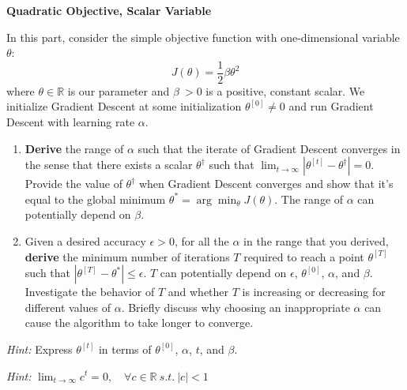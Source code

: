 \item {} {\bf Quadratic Objective, Scalar Variable}

In this part, consider the simple objective function with one-dimensional variable $\theta$:
\begin{equation*}
	J(\theta) = \frac{1}{2}\beta\theta^2
\end{equation*}
where $\theta \in\mathbb{R}$ is our parameter and $\beta\ > 0$ is a positive, constant scalar.
We initialize Gradient Descent at some initialization $\theta^{[0]} \neq 0$ and run Gradient Descent with learning rate $\alpha$. 

\begin{enumerate}
	\item \textbf{Derive} the range of $\alpha$ such that the iterate of Gradient Descent converges in the sense that there exists a scalar $\theta^\dagger$ such that $\lim_{t\to\infty} |\theta^{[t]}-\theta^\dagger| = 0$.   Provide the value of $\theta^\dagger$ when Gradient Descent converges and show that it's equal to the global minimum $\theta^* = \arg\min_\theta J(\theta)$. The range of $\alpha$ can potentially depend on $\beta$. 
	\item Given a desired accuracy $\epsilon > 0$, for all the $\alpha$ in the range that you derived, \textbf{derive} the minimum number of iterations $T$ required to reach a point $\theta^{[T]}$ such that $|\theta^{[T]} - \theta^*| \le \epsilon$. $T$ can potentially depend on $\epsilon$, $\theta^{[0]}$, $\alpha$, and $\beta$. Investigate the behavior of $T$ and whether $T$ is increasing or decreasing for different values of $\alpha$. Briefly discuss why choosing an inappropriate $\alpha$ can cause the algorithm to take longer to converge.
\end{enumerate}

\textit{Hint:} Express $\theta^{[t]}$ in terms of $\theta^{[0]}$, $\alpha$, $t$, and $\beta$. 

\textit{Hint:} $\lim_{t\to\infty} c^t = 0, \quad\forall c\in\mathbb{R} \ s.t.\ |c|<1$ 
